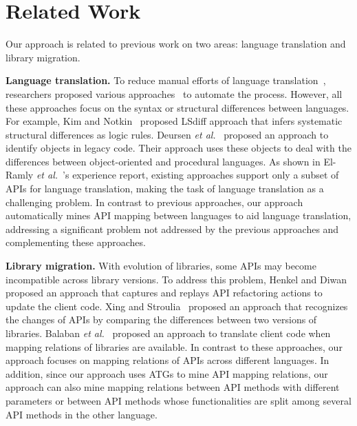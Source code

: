 \section{Related Work}
\label{sec:related}

Our approach is related to previous work on two areas:
language translation and library migration.

\textbf{Language translation.} To reduce manual efforts of language
translation~\cite{samet1981experience}, researchers proposed various
approaches~\cite{hassan2005lightweight,van1999identifying,waters1988program,mossienko2003automated,yasumatsu1995spice, kim2009discovering} to automate the process.
However, all these approaches focus on the syntax or structural differences between
languages. For example, Kim and Notkin~\cite{kim2009discovering} proposed LSdiff
approach that infers systematic structural differences as logic rules.
Deursen \emph{et al.}~\cite{van1999identifying} proposed an approach to identify
objects in legacy code. Their approach uses these objects to deal with the
differences between object-oriented and procedural languages. As
shown in El-Ramly \emph{et al.}~\cite{el2006experiment}'s experience
report, existing approaches support only a subset of APIs for language translation,
making the task of language translation as a challenging problem.
In contrast to previous approaches, our approach automatically mines API mapping between
languages to aid language translation, addressing a significant
problem not addressed by the previous approaches and complementing
these approaches.

\textbf{Library migration.} With evolution of libraries, some APIs
may become incompatible across library versions. To address this
problem, Henkel and Diwan~\cite{henkel2005catchup} proposed an approach that captures
and replays API refactoring actions to update the client code.
Xing and Stroulia~\cite{xing2007api} proposed an approach that
recognizes the changes of APIs by comparing the differences between two
versions of libraries. Balaban \emph{et al.}~\cite{balaban2005refactoring} proposed
an approach to translate client code when mapping relations of libraries are
available. In contrast to these approaches, our approach focuses on
mapping relations of APIs across different languages. In addition, since
our approach uses ATGs to mine API mapping relations, our approach can also
mine mapping relations between API methods with different parameters or between
API methods whose functionalities are split among several API methods in the other language.
